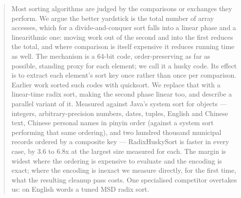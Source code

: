 \documentclass[twoside,leqno,twocolumn]{article}
\begin{document}
\begin{abstract}
    Most sorting algorithms are judged by the comparisons or exchanges they perform.
    We argue the better yardstick is the total number of array accesses,
    which for a divide-and-conquer sort falls into a linear phase and a linearithmic one:
    moving work out of the second and into the first reduces the total,
    and where comparison is itself expensive it reduces running time as well.
    The mechanism is a 64-bit code, order-preserving as far as possible,
    standing proxy for each element; we call it a husky code.
    Its effect is to extract each element's sort key once rather than once per comparison.
    Earlier work sorted such codes with quicksort.
    We replace that with a linear-time radix sort, making the second phase linear too,
    and describe a parallel variant of it.
    Measured against Java's system sort for objects --- integers, arbitrary-precision numbers,
    dates, tuples, English and Chinese text,
    Chinese personal names in pinyin order (against a system sort performing that same ordering),
    and two hundred thousand municipal records ordered by a composite key ---
    RadixHuskySort is faster in every case, by 3.6 to 6.8x at the largest size measured for each.
    The margin is widest where the ordering is expensive to evaluate and the encoding is exact;
    where the encoding is inexact we measure directly, for the first time,
    what the resulting cleanup pass costs.
    One specialised competitor overtakes us: on English words a tuned MSD radix sort.
\end{abstract}


\pagestyle{plain}
\thispagestyle{plain}


\end{document}
